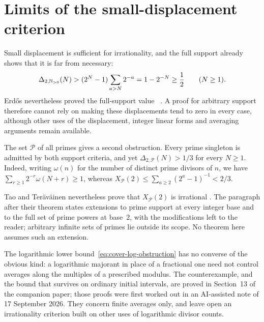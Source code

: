\documentclass[11pt]{article}
\begin{document}
\section{Limits of the small-displacement criterion}\label{sec:map}
Small displacement is sufficient for irrationality, and the full
support already shows that it is far from necessary:
\[
 \Delta_{2,\mathbb{N}_{>0}}(N)
 >(2^N-1)\sum_{a>N}2^{-a}=1-2^{-N}\ge\frac12
 \qquad(N\ge1).
\]
Erd\H{o}s nevertheless proved the full-support value
~\cite{erdos1948}.
A proof for arbitrary support therefore cannot rely on making these
displacements tend to zero in every case, although other uses of the
displacement, integer linear forms and averaging arguments remain
available.

The set $\mathcal P$ of all primes gives a second obstruction. Every
prime singleton is admitted by both support criteria, and yet
$\Delta_{2,\mathcal P}(N)>1/3$ for every $N\ge1$. Indeed, writing
$\omega(n)$ for the number of distinct prime divisors of $n$, we have
$\sum_{r\ge1}2^{-r}\omega(N+r)\ge1$, whereas
$X_{\mathcal P}(2)\le\sum_{a\ge2}(2^a-1)^{-1}<2/3$.


Tao and Ter\"av\"ainen nevertheless prove that $X_{\mathcal P}(2)$ is
irrational \cite[Theorem~1.3, p.~4]{taoteravainen2025}. The paragraph
after their theorem states extensions to prime support at every
integer base and to the full set of prime powers at base~$2$, with the
modifications left to the reader; arbitrary infinite sets of primes lie
outside its scope. No theorem here assumes such an extension.


The logarithmic lower bound~\eqref{eq:cover-log-obstruction} has no
converse of the obvious kind: a logarithmic majorant in place of a
fractional one need not control averages along the multiples of a
prescribed modulus. The counterexample, and the bound that survives on
ordinary initial intervals, are proved in
{Section~13 of the companion paper}; those proofs were first worked
out in an AI-assisted note of 17 September 2026. They concern finite
averages only, and leave open an irrationality criterion built on other
uses of logarithmic divisor counts.
\end{document}
